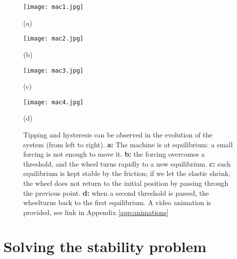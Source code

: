 \begin{figure}[h]
	\centering
	\begin{minipage}[c]{0.22\textwidth}
		\texttt{[image: mac1.jpg]}
		\renewcommand{\figurename}{Fig.}
		\caption*{(a)}
	\end{minipage}
	\hspace{0.1cm}
	\begin{minipage}[c]{0.22\textwidth}
		\texttt{[image: mac2.jpg]}
		\renewcommand{\figurename}{Fig.}
		\caption*{(b)}
	\end{minipage} 
	\hspace{0.1cm}
	\begin{minipage}[c]{0.22\textwidth}
		\texttt{[image: mac3.jpg]}
		\renewcommand{\figurename}{Fig.}
		\caption*{(c)}
	\end{minipage}
	\hspace{0.1cm}
	\begin{minipage}[c]{0.22\textwidth}
		\texttt{[image: mac4.jpg]}
		\renewcommand{\figurename}{Fig.}
		\caption*{(d)}
	\end{minipage}
	\caption{\small Tipping and hysteresis can be observed in the evolution of the system (from left to right). \textbf{a:} The machine is at equilibrium: a small forcing is not enough to move it. \textbf{b:} the forcing overcomes a threshold, and the wheel turns rapidly to a new equilibrium. \textbf{c:} such equilibrium is kept stable by the friction; if we let the elastic shrink, the wheel does not return to the initial position by passing through the previous point. \textbf{d:} when a second threshold is passed, the wheelturns back to the first equilibrium. A video animation is provided, see link in Appendix \ref{app:animations}}
	\label{fig:CM_eamples}
\end{figure}




\tocless\section{Solving the stability problem}

